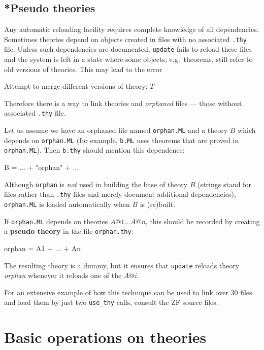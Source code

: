 \subsection{*Pseudo theories}
Any automatic reloading facility requires complete knowledge of all
dependencies.  Sometimes theories depend on objects created in \ML{} files
with no associated {\tt.thy} file.  Unless such dependencies are documented,
{\tt update} fails to reload these \ML{} files and the system is left in a
state where some objects, e.g.\ theorems, still refer to old versions of
theories. This may lead to the error
\begin{ttbox}
Attempt to merge different versions of theory: \(T\)
\end{ttbox}
Therefore there is a way to link theories and {\em orphaned\/} \ML{} files ---
those without associated {\tt.thy} file.

Let us assume we have an orphaned \ML{} file named {\tt orphan.ML} and a theory
$B$ which depends on {\tt orphan.ML} (for example, {\tt b.ML} uses theorems
that are proved in {\tt orphan.ML}). Then {\tt b.thy} should mention this
dependence:
\begin{ttbox}
B = ... + "orphan" + ...
\end{ttbox}
Although {\tt orphan} is {\em not\/} used in building the base of theory $B$
(strings stand for \ML{} files rather than {\tt.thy} files and merely document
additional dependencies), {\tt orphan.ML} is loaded automatically when $B$ is
(re)built.

If {\tt orphan.ML} depends on theories $A@1\dots A@n$, this should be recorded
by creating a {\bf pseudo theory} in the file {\tt orphan.thy}:
\begin{ttbox}
orphan = A1 + \(...\) + An
\end{ttbox}
The resulting theory is a dummy, but it ensures that {\tt update} reloads
theory {\it orphan} whenever it reloads one of the $A@i$.

For an extensive example of how this technique can be used to link over 30
files and load them by just two {\tt use_thy} calls, consult the ZF source
files.




\section{Basic operations on theories}
